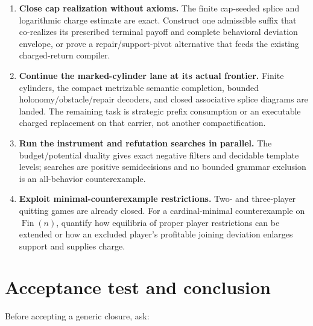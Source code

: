 \documentclass[11pt]{article}
\begin{document}
\begin{enumerate}
to physical arcs, and on each reachable recurrent component produce a charged
zero-defect flow or a strategically decoded separator.  A feasible legal word
should feed the signed compiler through cyclic Abel discrepancy; an exact
finite-forward producer may instead use the landed finite charged-closing
adapter.  Matching analytic packet extraction, target mismatch, and both
downstream compilers are already closed.
\item \textbf{Close cap realization without axioms.}  The finite cap-seeded
splice and logarithmic charge estimate are exact.  Construct one admissible
suffix that co-realizes its prescribed terminal payoff and complete behavioral
deviation envelope, or prove a repair/support-pivot alternative that feeds the
existing charged-return compiler.
\item \textbf{Continue the marked-cylinder lane at its actual frontier.}
Finite cylinders, the compact metrizable semantic completion, bounded
holonomy/obstacle/repair decoders, and closed associative splice diagrams are
landed.  The remaining task is strategic prefix consumption or an executable
charged replacement on that carrier, not another compactification.
\item \textbf{Run the instrument and refutation searches in parallel.}
The budget/potential duality gives exact negative filters and decidable
template levels; searches are positive semidecisions and no bounded
grammar exclusion is an all-behavior counterexample.
\item \textbf{Exploit minimal-counterexample restrictions.}  Two- and
three-player quitting games are already closed.  For a cardinal-minimal
counterexample on \(\operatorname{Fin}(n)\), quantify how equilibria of proper
player restrictions can be extended or how an excluded player's profitable
joining deviation enlarges support and supplies charge.
\end{enumerate}

\section{Acceptance test and conclusion}

Before accepting a generic closure, ask:
\end{document}
